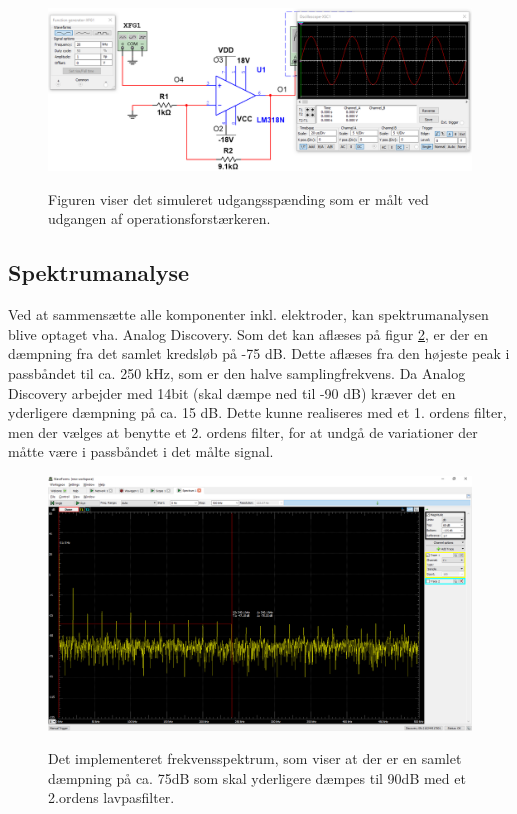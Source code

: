 \begin{figure}[H] 
\centering
{\includegraphics[width=\linewidth]
{Figure/opampmultisim}}
\caption{Figuren viser det simuleret udgangsspænding som er målt ved udgangen af operationsforstærkeren.}
\label{opampmultisim}
\end{figure}


\subsection{Spektrumanalyse}

Ved at sammensætte alle komponenter inkl. elektroder, kan spektrumanalysen blive optaget vha. Analog Discovery. Som det kan aflæses på figur \ref{fig:aaspectrum1}, er der en dæmpning fra det samlet kredsløb på -75 dB. Dette aflæses fra den højeste peak i passbåndet til ca. 250 kHz, som er den halve samplingfrekvens. Da Analog Discovery arbejder med 14bit (skal dæmpe ned til -90 dB) kræver det en yderligere dæmpning på ca. 15 dB. Dette kunne realiseres med et 1. ordens filter, men der vælges at benytte et 2. ordens filter, for at undgå de variationer der måtte være i passbåndet i det målte signal.


\begin{figure}[H] 
\centering
{\includegraphics[width=\linewidth]
{Figure/aaspectrum1}}
\caption{Det implementeret frekvensspektrum, som viser at der er en samlet dæmpning på ca. 75dB som skal yderligere dæmpes til 90dB med et 2.ordens lavpasfilter.}
\label{fig:aaspectrum1}
\end{figure}


